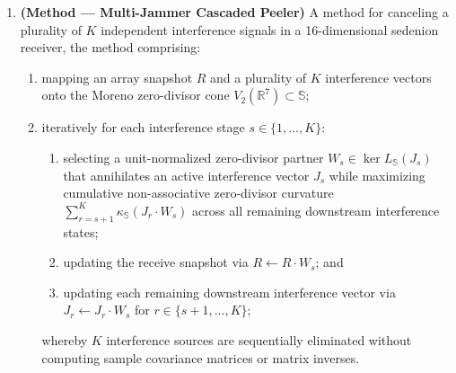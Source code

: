 \documentclass[12pt,letterpaper]{article}
\begin{document}
\begin{enumerate}[leftmargin=20pt,itemsep=4pt]
    \item \textbf{(Method --- Multi-Jammer Cascaded Peeler)} A method for canceling a plurality of $K$ independent interference signals in a 16-dimensional sedenion receiver, the method comprising:
    \begin{enumerate}[leftmargin=16pt,itemsep=1pt]
        \item mapping an array snapshot $R$ and a plurality of $K$ interference vectors onto the Moreno zero-divisor cone $V_2(\mathbb{R}^7) \subset \mathbb{S}$;
        \item iteratively for each interference stage $s \in \{1,\dots,K\}$:
        \begin{enumerate}[leftmargin=14pt,itemsep=1pt]
            \item selecting a unit-normalized zero-divisor partner $W_s \in \ker L_{\mathbb{S}}(J_s)$ that annihilates an active interference vector $J_s$ while maximizing cumulative non-associative zero-divisor curvature $\sum_{r=s+1}^K \kappa_{\mathbb{S}}(J_r \cdot W_s)$ across all remaining downstream interference states;
            \item updating the receive snapshot via $R \leftarrow R \cdot W_s$; and
            \item updating each remaining downstream interference vector via $J_r \leftarrow J_r \cdot W_s$ for $r \in \{s+1,\dots,K\}$;
        \end{enumerate}
        whereby $K$ interference sources are sequentially eliminated without computing sample covariance matrices or matrix inverses.
    \end{enumerate}


\end{enumerate}
\end{document}
